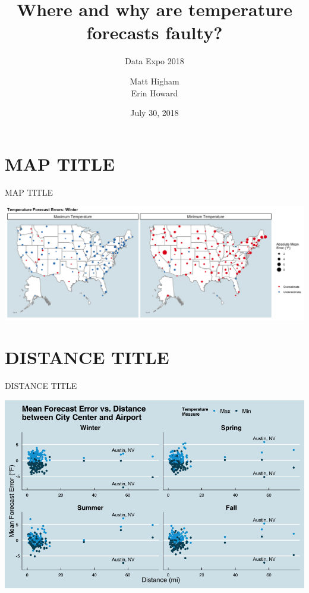 \documentclass[handout,t]{beamer}
\title[Where and why are temperature forecasts faulty?]{Where and why are temperature forecasts faulty?}
\subtitle{Data Expo 2018}
\date{July 30, 2018}
\author[Matt Higham, Erin Howard]{Matt Higham \\ Erin Howard}
\begin{document}

\frame{\titlepage}
\section{MAP TITLE}
\begin{frame}{MAP TITLE}
  \begin{center}
  \vspace{-0.25in}
  \includegraphics[scale=0.25]{Both_winter_maps.png}
  \end{center}
\end{frame}


\section{DISTANCE TITLE}
\begin{frame}{DISTANCE TITLE}
  \begin{center}
  \includegraphics[scale=0.25]{Distance_Plot_Poster.png}
  \end{center}
\end{frame}
\end{document}
